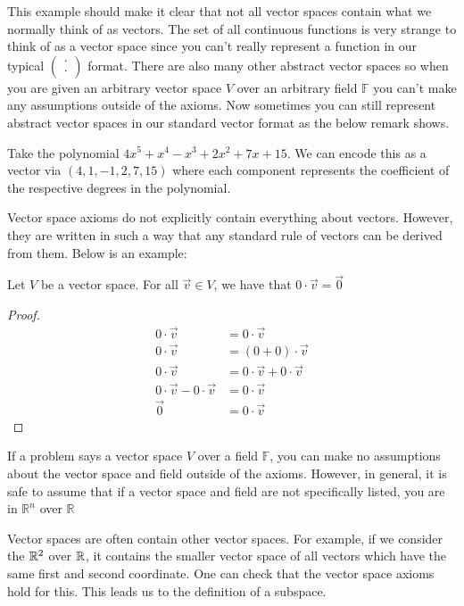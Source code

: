 This example should make it clear that not all vector spaces contain what we normally think of as vectors. The set of all continuous functions is very strange to think of as a vector space since you can't really represent a function in our typical $\begin{pmatrix}
    \cdot \\ \cdot
\end{pmatrix}$ format. There are also many other abstract vector spaces so when you are given an arbitrary vector space $V$ over an arbitrary field $\mathbb{F}$ you can't make any assumptions outside of the axioms. Now sometimes you can still represent abstract vector spaces in our standard vector format as the below remark shows.
\begin{remark}
    Take the polynomial $4x^5+x^4-x^3+2x^2+7x+15$. We can encode this as a vector via $(4, 1, -1, 2, 7, 15)$ where each component represents the coefficient of the respective degrees in the polynomial.
\end{remark}
Vector space axioms do not explicitly contain everything about vectors. However, they are written in such a way that any standard rule of vectors can be derived from them. Below is an example:
\begin{theorem}
    Let $V$ be a vector space. For all $\vec{v}\in V$, we have that $0\cdot\vec{v}=\vec{0}$
\end{theorem}
\begin{proof}
    \begin{align*}
        0\cdot\vec{v}&=0\cdot\vec{v}\\
        0\cdot\vec{v}&=(0+0)\cdot\vec{v}\tag{from Additive Identity}\\
        0\cdot\vec{v}&=0\cdot\vec{v}+0\cdot\vec{v}\tag{from Vector Over Scalar Distributivity}\\
        0\cdot\vec{v}-0\cdot\vec{v}&=0\cdot\vec{v}\\
        \vec{0}&=0\cdot\vec{v}\tag{from Additive Inverse}
    \end{align*}
\end{proof}
\begin{remark}
    If a problem says a vector space $V$ over a field $\mathbb{F}$, you can make no assumptions about the vector space and field outside of the axioms. However, in general, it is safe to assume that if a vector space and field are not specifically listed, you are in $\mathbb{R}^n$ over $\mathbb{R}$
\end{remark}
Vector spaces are often contain other vector spaces. For example, if we consider the $\mathbb{R}^2$ over $\mathbb{R}$, it contains the smaller vector space of all vectors which have the same first and second coordinate. One can check that the vector space axioms hold for this. This leads us to the definition of a subspace.
